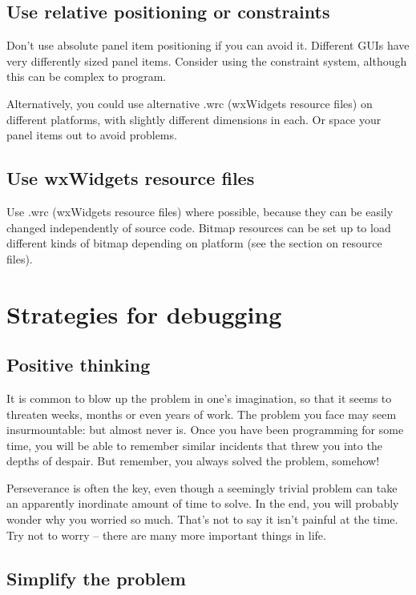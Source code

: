 \subsection{Use relative positioning or constraints}

Don't use absolute panel item positioning if you can avoid it. Different GUIs have
very differently sized panel items. Consider using the constraint system, although this
can be complex to program.

Alternatively, you could use alternative .wrc (wxWidgets resource files) on different
platforms, with slightly different dimensions in each. Or space your panel items out
to avoid problems.

\subsection{Use wxWidgets resource files}

Use .wrc (wxWidgets resource files) where possible, because they can be easily changed
independently of source code. Bitmap resources can be set up to load different
kinds of bitmap depending on platform (see the section on resource files).

\section{Strategies for debugging}\label{debugstrategies}

\subsection{Positive thinking}

It is common to blow up the problem in one's imagination, so that it seems to threaten
weeks, months or even years of work. The problem you face may seem insurmountable:
but almost never is. Once you have been programming for some time, you will be able
to remember similar incidents that threw you into the depths of despair. But
remember, you always solved the problem, somehow!

Perseverance is often the key, even though a seemingly trivial problem
can take an apparently inordinate amount of time to solve. In the end,
you will probably wonder why you worried so much. That's not to say it
isn't painful at the time. Try not to worry -- there are many more important
things in life.

\subsection{Simplify the problem}

